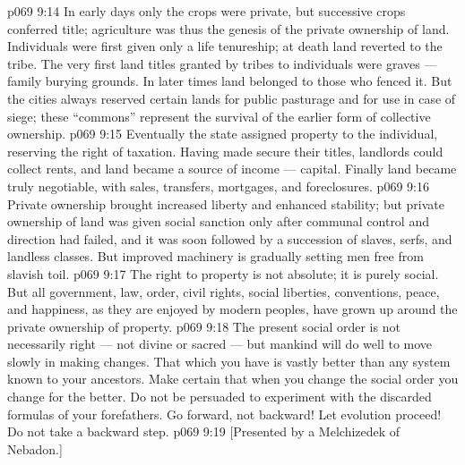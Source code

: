 \vs p069 9:14 In early days only the crops were private, but successive crops conferred title; agriculture was thus the genesis of the private ownership of land. Individuals were first given only a life tenureship; at death land reverted to the tribe. The very first land titles granted by tribes to individuals were graves --- family burying grounds. In later times land belonged to those who fenced it. But the cities always reserved certain lands for public pasturage and for use in case of siege; these “commons” represent the survival of the earlier form of collective ownership.
\vs p069 9:15 Eventually the state assigned property to the individual, reserving the right of taxation. Having made secure their titles, landlords could collect rents, and land became a source of income --- capital. Finally land became truly negotiable, with sales, transfers, mortgages, and foreclosures.
\vs p069 9:16 Private ownership brought increased liberty and enhanced stability; but private ownership of land was given social sanction only after communal control and direction had failed, and it was soon followed by a succession of slaves, serfs, and landless classes. But improved machinery is gradually setting men free from slavish toil.
\vs p069 9:17 The right to property is not absolute; it is purely social. But all government, law, order, civil rights, social liberties, conventions, peace, and happiness, as they are enjoyed by modern peoples, have grown up around the private ownership of property.
\vs p069 9:18 The present social order is not necessarily right --- not divine or sacred --- but mankind will do well to move slowly in making changes. That which you have is vastly better than any system known to your ancestors. Make certain that when you change the social order you change for the better. Do not be persuaded to experiment with the discarded formulas of your forefathers. Go forward, not backward! Let evolution proceed! Do not take a backward step.
\vsetoff
\vs p069 9:19 [Presented by a Melchizedek of Nebadon.]
\quizlink
